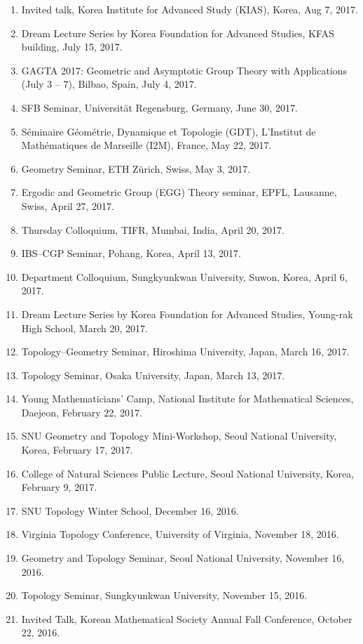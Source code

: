 \documentclass[11pt,a4paper]{article}
\begin{document}
\begin{enumerate}[leftmargin=1.5em, label=\arabic*.]
\item Invited talk, Korea Institute for Advanced Study (KIAS), Korea, Aug 7, 2017.
\item Dream Lecture Series by Korea Foundation for Advanced Studies, KFAS building, July 15, 2017.
\item GAGTA 2017: Geometric and Asymptotic Group Theory with Applications (July 3 -- 7), Bilbao, Spain, July 4, 2017.
\item SFB Seminar, Universität Regensburg, Germany, June 30, 2017.
\item Séminaire Géométrie, Dynamique et Topologie (GDT), L'Institut de Mathématiques de Marseille (I2M), France, May 22, 2017.
\item Geometry Seminar, ETH Zürich, Swiss, May 3, 2017.
\item Ergodic and Geometric Group (EGG) Theory seminar, EPFL, Lausanne, Swiss, April 27, 2017.
\item Thursday Colloquium, TIFR, Mumbai, India, April 20, 2017.
\item IBS--CGP Seminar, Pohang, Korea, April 13, 2017.
\item Department Colloquium, Sungkyunkwan University, Suwon, Korea, April 6, 2017.
\item Dream Lecture Series by Korea Foundation for Advanced Studies, Young-rak High School, March 20, 2017.
\item Topology--Geometry Seminar, Hiroshima University, Japan, March 16, 2017.
\item Topology Seminar, Osaka University, Japan, March 13, 2017.
\item Young Mathematicians' Camp, National Institute for Mathematical Sciences, Daejeon, February 22, 2017.
\item SNU Geometry and Topology Mini-Workshop, Seoul National University, Korea, February 17, 2017.
\item College of Natural Sciences Public Lecture, Seoul National University, Korea, February 9, 2017.
\item SNU Topology Winter School, December 16, 2016.
\item Virginia Topology Conference, University of Virginia, November 18, 2016.
\item Geometry and Topology Seminar, Seoul National University, November 16, 2016.
\item Topology Seminar, Sungkyunkwan University, November 15, 2016.
\item Invited Talk, Korean Mathematical Society Annual Fall Conference, October 22, 2016.

\end{enumerate}
\end{document}
